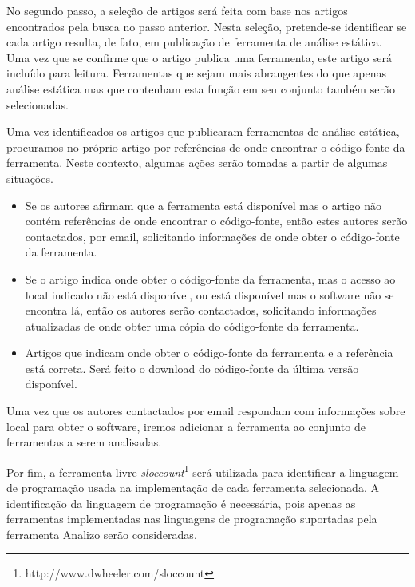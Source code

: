 No segundo passo, a seleção de artigos será feita com base nos artigos
encontrados pela busca no passo anterior.  Nesta seleção, pretende-se
identificar se cada artigo resulta, de fato, em publicação de ferramenta de
análise estática. Uma vez que se confirme que o artigo publica uma
ferramenta, este artigo será incluído para leitura. Ferramentas que sejam
mais abrangentes do que apenas análise estática mas que contenham esta função
em seu conjunto também serão selecionadas.

Uma vez identificados os artigos que publicaram ferramentas de análise
estática, procuramos no próprio artigo por referências de onde encontrar o
código-fonte da ferramenta. Neste contexto, algumas ações serão tomadas a
partir de algumas situações.

\begin{itemize}

  \item Se os autores afirmam que a ferramenta está disponível mas o artigo
    não contém referências de onde encontrar o código-fonte, então estes
    autores serão contactados, por email, solicitando informações de onde
    obter o código-fonte da ferramenta.

  \item Se o artigo indica onde obter o código-fonte da ferramenta, mas o acesso ao local
    indicado não está disponível, ou está disponível mas o software não se
    encontra lá, então os autores serão contactados, solicitando informações
    atualizadas de onde obter uma cópia do código-fonte da ferramenta.

  \item Artigos que indicam onde obter o código-fonte da ferramenta e a referência
    está correta. Será feito o download do código-fonte da última versão
    disponível.

\end{itemize}

Uma vez que os autores contactados por email respondam com informações sobre
local para obter o software, iremos adicionar a ferramenta ao conjunto de ferramentas
a serem analisadas.

Por fim, a ferramenta livre {\it
sloccount}\footnote{http://www.dwheeler.com/sloccount} será  utilizada para
identificar a linguagem de programação usada na implementação de cada
ferramenta selecionada.  A identificação da linguagem de programação é
necessária, pois apenas as ferramentas implementadas nas linguagens de
programação suportadas pela ferramenta Analizo serão consideradas.

